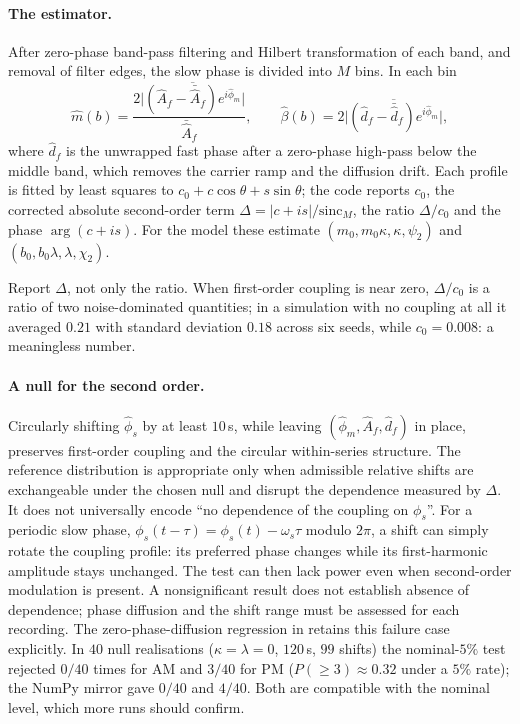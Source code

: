 \paragraph{The estimator.} After zero-phase band-pass filtering and Hilbert
transformation of each band, and removal of filter edges, the slow phase
is divided into $M$ bins. In each bin
\[
\hat m(b)=\frac{2\lvert\overline{(\hat A_f-\bar{\hat A}_f)e^{i\hat\phi_m}}\rvert}
{\bar{\hat A}_f},\qquad
\hat\beta(b)=2\lvert\overline{(\hat d_f-\bar{\hat d}_f)e^{i\hat\phi_m}}\rvert,
\]
where $\hat d_f$ is the unwrapped fast phase after a zero-phase high-pass
below the middle band, which removes the carrier ramp and the diffusion
drift. Each profile is fitted by least squares to
$c_0+c\cos\theta+s\sin\theta$; the code reports $c_0$, the corrected
absolute second-order term $\Delta=\lvert c+is\rvert/\mathrm{sinc}_M$, the
ratio $\Delta/c_0$ and the phase $\arg(c+is)$. For the model these
estimate $(m_0,m_0\kappa,\kappa,\psi_2)$ and $(b_0,b_0\lambda,\lambda,\chi_2)$.

\begin{caution}
Report $\Delta$, not only the ratio. When first-order coupling is near
zero, $\Delta/c_0$ is a ratio of two noise-dominated quantities; in a
simulation with no coupling at all it averaged $0.21$ with standard
deviation $0.18$ across six seeds, while $c_0=0.008$: a meaningless number.
\end{caution}

\paragraph{A null for the second order.} Circularly shifting $\hat\phi_s$
by at least $10$\,s, while leaving $(\hat\phi_m,\hat A_f,\hat d_f)$ in
place, preserves first-order coupling and the circular within-series
structure. The reference distribution is appropriate only when admissible
relative shifts are exchangeable under the chosen null and disrupt the
dependence measured by $\Delta$. It does not universally encode ``no
dependence of the coupling on $\phi_s$''. For a periodic slow phase,
$\phi_s(t-\tau)=\phi_s(t)-\omega_s\tau$ modulo $2\pi$, a shift can simply
rotate the coupling profile: its preferred phase changes while its
first-harmonic amplitude stays unchanged. The test can then lack power
even when second-order modulation is present. A nonsignificant result
does not establish absence of dependence; phase diffusion and the shift
range must be assessed for each recording. The zero-phase-diffusion
regression in  retains
this failure case explicitly. In $40$
null realisations ($\kappa=\lambda=0$, $120$\,s, $99$ shifts) the
nominal-$5\%$ test rejected $0/40$ times for AM and $3/40$ for PM
($P(\ge3)\approx0.32$ under a $5\%$ rate); the NumPy mirror gave $0/40$
and $4/40$. Both are compatible with the nominal level, which more runs
should confirm.

